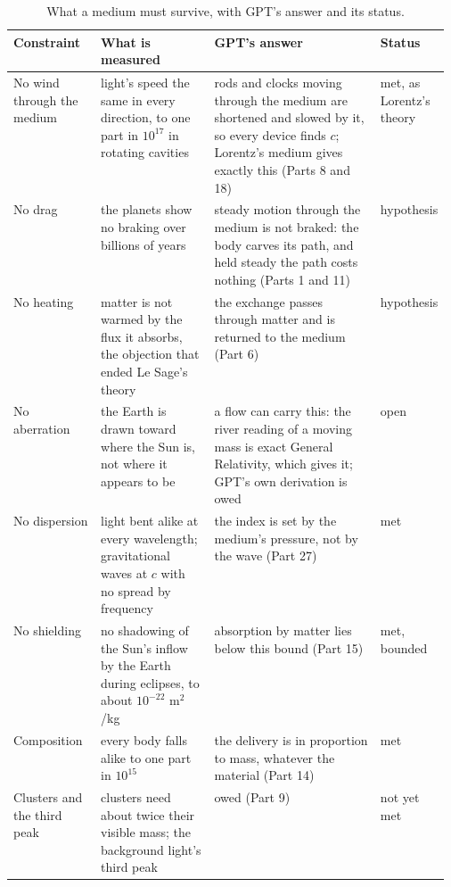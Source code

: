 \documentclass[11pt,a4paper]{article}
\begin{document}
\begin{table}[t]\centering\footnotesize
\caption{What a medium must survive, with GPT's answer and its status.}
\renewcommand{\arraystretch}{1.08}\begin{tabularx}{\linewidth}{@{}>{\raggedright\arraybackslash}p{0.2\linewidth} >{\raggedright\arraybackslash}p{0.26\linewidth} >{\raggedright\arraybackslash}X >{\raggedright\arraybackslash}p{0.11\linewidth}@{}}\toprule
\textbf{Constraint} & \textbf{What is measured} & \textbf{GPT's answer} & \textbf{Status}\\\midrule
No wind through the medium & light's speed the same in every direction, to one part in $10^{17}$ in rotating cavities & rods and clocks moving through the medium are shortened and slowed by it, so every device finds $c$; Lorentz's medium gives exactly this (Parts 8 and 18) & met, as Lorentz's theory\\
No drag & the planets show no braking over billions of years & steady motion through the medium is not braked: the body carves its path, and held steady the path costs nothing (Parts 1 and 11) & hypothesis\\
No heating & matter is not warmed by the flux it absorbs, the objection that ended Le Sage's theory & the exchange passes through matter and is returned to the medium (Part 6) & hypothesis\\
No aberration & the Earth is drawn toward where the Sun is, not where it appears to be & a flow can carry this: the river reading of a moving mass is exact General Relativity, which gives it; GPT's own derivation is owed & open\\
No dispersion & light bent alike at every wavelength; gravitational waves at $c$ with no spread by frequency & the index is set by the medium's pressure, not by the wave (Part 27) & met\\
No shielding & no shadowing of the Sun's inflow by the Earth during eclipses, to about $10^{-22}$ m$^2$/kg & absorption by matter lies below this bound (Part 15) & met, bounded\\
Composition & every body falls alike to one part in $10^{15}$ & the delivery is in proportion to mass, whatever the material (Part 14) & met\\
Clusters and the third peak & clusters need about twice their visible mass; the background light's third peak & owed (Part 9) & not yet met\\\bottomrule
\end{tabularx}\label{tab:survive}\end{table}
\end{document}
